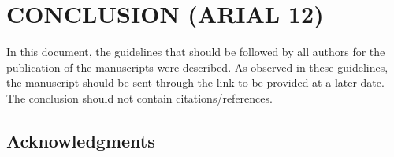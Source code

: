 \documentclass[
	article,			%
	12pt,				%
	oneside,			%
	a4paper,			%
	english,			%
	brazil,				%
	sumario=tradicional
	]{abntex2}
\begin{document}
     
   






% 

\section{\textbf{CONCLUSION (ARIAL 12)}}

In this document, the guidelines that should be followed by all authors for the publication of the manuscripts were described. As observed in these guidelines, the manuscript should be sent through the link to be provided at a later date.
The conclusion should not contain citations/references.


\subsection*{\textbf{Acknowledgments}}
\end{document}
